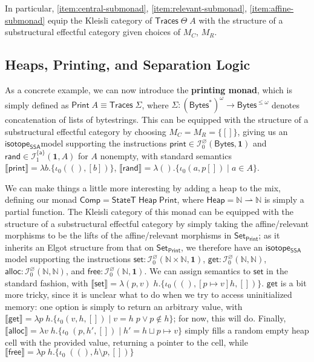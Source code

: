 \documentclass[acmsmall,screen,review]{acmart}
\newcommand{\mc}[1]{\ensuremath{\mathcal{#1}}}
\newcommand{\mb}[1]{\ensuremath{\mathbf{#1}}}
\newcommand{\ms}[1]{\ensuremath{\mathsf{#1}}}
\newcommand{\nats}{\mathbb{N}}
\newcommand{\taff}{{\{\ms{a}\}}}
\newcommand{\dnt}[1]{\llbracket{#1}\rrbracket}
\newcommand{\isotopessa}{\ms{isotope_{SSA}}}
\begin{document}
In particular, \ref{item:central-submonad}, \ref{item:relevant-submonad},
\ref{item:affine-submonad} equip the Kleisli category of
\(\ms{Traces}\;\Theta\;A\) with the structure of a substructural effectful
category given choices of \(M_C\), \(M_R\).

\subsection{Heaps, Printing, and Separation Logic}

\label{ssec:separation}

As a concrete example, we can now introduce the \textbf{printing monad}, which
is simply defined as \(\ms{Print}\;A \equiv \ms{Traces}\;\Sigma\), where
\(\Sigma: (\ms{Bytes}^*)^\omega \to \ms{Bytes}^{\leq \omega}\) denotes
concatenation of lists of bytestrings. This can be equipped with the structure
of a substructural effectful category by choosing \(M_C = M_R = \{[]\}\), giving
us an \isotopessa model supporting the instructions \(\ms{print} \in
\mc{I}^\varnothing_0(\ms{Bytes}, \mb{1})\) and \(\ms{rand} \in
\mc{I}^\taff_1(\mb{1}, A)\) for \(A\) nonempty, with standard semantics
\(\dnt{\ms{print}} = \lambda b.\{\iota_0 ((), [b])\}\), \(\dnt{\ms{rand}} =
\lambda (). \{\iota_0 (a, p[]) \mid a \in A\}\).

We can make things a little more interesting by adding a heap to the mix,
defining our monad \(\ms{Comp} = \ms{StateT}\;\ms{Heap}\;\ms{Print}\), where
\(\ms{Heap} = \nats \rightharpoonup \nats\) is simply a partial function. The
Kleisli category of this monad can be equipped with the structure of a
substructural effectful category by simply taking the affine/relevant morphisms
to be the lifts of the affine/relevant morphisms in \(\ms{Set}_{\ms{Print}}\);
as it inherits an Elgot structure from that on \(\ms{Set}_{\ms{Print}}\), we
therefore have an \isotopessa model supporting the instructions \(\ms{set}:
\mc{I}^\varnothing_0(\nats \times \nats, \mb{1})\), \(\ms{get}:
\mc{I}^\varnothing_0(\nats, \nats)\), \(\ms{alloc}: \mc{I}^\varnothing_0(\nats,
\nats)\), and \(\ms{free}: \mc{I}^\varnothing_0(\nats, \mb{1})\). We can assign
semantics to \(\ms{set}\) in the standard fashion, with \(\dnt{\ms{set}} =
\lambda (p, v)\;h. \{\iota_0((), [p \mapsto v]h, [])\}\). \(\ms{get}\) is a bit
more tricky, since it is unclear what to do when we try to access uninitialized
memory: one option is simply to return an arbitrary value, with \(\dnt{\ms{get}}
= \lambda p\;h. \{\iota_0(v, h, []) \mid v = h\;p \lor p \notin h\}\); for now,
this will do. Finally, \(\dnt{\ms{alloc}} = \lambda v\;h.\{\iota_0\;(p, h', [])
\mid h' = h \sqcup p \mapsto v\}\) simply fills a random empty heap cell with
the provided value, returning a pointer to the cell, while \(\dnt{\ms{free}} =
\lambda p\;h. \{\iota_0\;((), h \setminus p, [])\}\)
\end{document}

